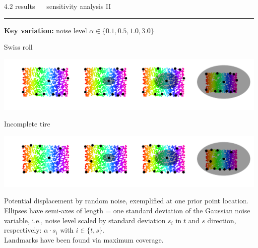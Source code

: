 \documentclass[11pt, compress, t, notes = noshow, xcolor = table, 
aspectratio = 1610]{beamer}
\begin{document}
\LARGE
\begin{frame}{\textcolor{gray!90}{4.2 results} ~~ sensitivity analysis II}
\normalsize
\vspace{-0.5cm}
\noindent \textcolor{gray!90}{\rule{\textwidth}{1pt}}
\smallskip

\textbf{Key variation:} noise level $\alpha \in \{0.1, 0.5, 1.0, 3.0\}$ 

\vspace{0.3cm}

\begin{minipage}[c]{0.2\textwidth}
  Swiss roll
\end{minipage}%
\begin{minipage}[c]{0.8\textwidth}
  \includegraphics[trim = 40 30 0 0, clip, %
    width = \textwidth]{figures/sensitivity_noise_key_swiss_roll}
\end{minipage}

\vspace{0.3cm}   

\begin{minipage}[c]{0.2\textwidth}
  Incomplete tire
\end{minipage}%
\begin{minipage}[c]{0.8\textwidth}
  \includegraphics[trim = 40 30 0 0, clip, %
    width = \textwidth]{figures/sensitivity_noise_key_incomplete_tire}
\end{minipage}

\vfill

\scriptsize
Potential displacement by random noise, exemplified at one prior point location. 
\\
Ellipses have semi-axes of length = one standard deviation of the Gaussian noise 
variable, i.e., noise level scaled by standard deviation $s_i$ in $t$ and $s$ 
direction, respectively: $\alpha \cdot s_i$ with $i \in \{t, s\}$. \\
Landmarks have been found via maximum coverage.

\end{frame}
\end{document}
